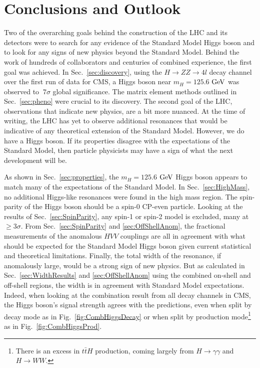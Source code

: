 \chapter{Conclusions and Outlook}
\label{sec:conclusions}

Two of the overarching goals behind the construction of the LHC and its detectors were to search for any evidence of the Standard Model Higgs boson and to look for any signs of new physics beyond the Standard Model. Behind the work of hundreds of collaborators and centuries of combined experience, the first goal was achieved. In Sec.~\ref{sec:discovery}, using the $H\rightarrow ZZ\rightarrow 4l$ decay channel over the first run of data for CMS, a Higgs boson near $m_{H}=125.6$ $\rm{GeV}$ was observed to $~7\sigma$ global significance. The matrix element methods outlined in Sec.~\ref{sec:pheno} were crucial to its discovery. The second goal of the LHC, observations that indicate new physics, are a bit more nuanced. At the time of writing, the LHC has yet to observe additional resonances that would be indicative of any theoretical extension of the Standard Model. However, we do have a Higgs boson. If its properties disagree with the expectations of the Standard Model, then particle physicists may have a sign of what the next development will be.

As shown in Sec.~\ref{sec:properties}, the $m_{H}=125.6$ $\rm{GeV}$ Higgs boson appears to match many of the expectations of the Standard Model. In Sec.~\ref{sec:HighMass}, no additional Higgs-like resonances were found in the high mass region. The spin-parity of the Higgs boson should be a spin-0 CP-even particle. Looking at the results of Sec.~\ref{sec:SpinParity}, any spin-1 or spin-2 model is excluded, many at $\geq3\sigma$. From Sec.~\ref{sec:SpinParity} and \ref{sec:OffShellAnom}, the fractional measurements of the anomalous $HVV$ couplings are all in agreement with what should be expected for the Standard Model Higgs boson given current statistical and theoretical limitations. Finally, the total width of the resonance, if anomalously large, would be a strong sign of new physics. But as calculated in Sec.~\ref{sec:WidthResults} and \ref{sec:OffShellAnom} using the combined on-shell and off-shell regions, the width is in agreement with Standard Model expectations. Indeed, when looking at the combination result from all decay channels in CMS, the Higgs boson's signal strength agrees with the predictions, even when split by decay mode as in Fig.~\ref{fig:CombHiggsDecay} or when split by production mode\footnote{There is an excess in $t\bar{t}H$ production, coming largely from $H\rightarrow \gamma\gamma$ and $H\rightarrow WW$.} as in Fig.~\ref{fig:CombHiggsProd}.

